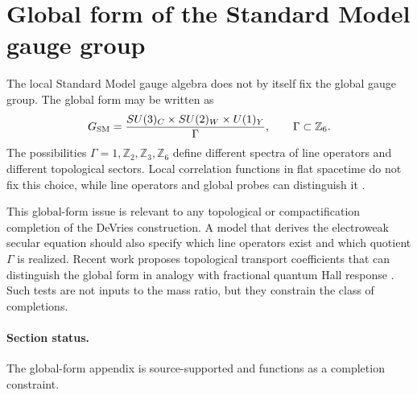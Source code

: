 \section{Global form of the Standard Model gauge group}
\label{sec:global-form}

The local Standard Model gauge algebra does not by itself fix the global gauge group.  The global form may be written as
\begin{equation}
  G_{\rm SM}=\frac{SU(3)_C\times SU(2)_W\times U(1)_Y}{\Gamma},
  \qquad
  \Gamma\subset \mathbb Z_6.
  \label{eq:gsm-global}
\end{equation}
The possibilities \(\Gamma=1,\mathbb Z_2,\mathbb Z_3,\mathbb Z_6\) define different spectra of line operators and different topological sectors.  Local correlation functions in flat spacetime do not fix this choice, while line operators and global probes can distinguish it \cite{TongLineOperators2017,TongGauge}.

This global-form issue is relevant to any topological or compactification completion of the DeVries construction.  A model that derives the electroweak secular equation should also specify which line operators exist and which quotient \(\Gamma\) is realized.  Recent work proposes topological transport coefficients that can distinguish the global form in analogy with fractional quantum Hall response \cite{HsinGomis2024}.  Such tests are not inputs to the mass ratio, but they constrain the class of completions.

\paragraph*{Section status.}  The global-form appendix is source-supported and functions as a completion constraint.
